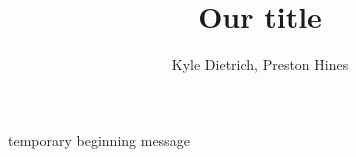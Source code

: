 \documentclass[a4paper, 12pt]{article}
\begin{document}
\title{Our title}
\author{Kyle Dietrich, Preston Hines}
\maketitle
temporary beginning message
\end{document}
